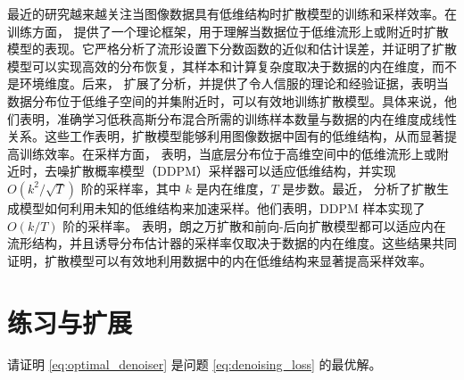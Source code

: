 \documentclass[../../book-main_zh.tex]{subfiles}
\begin{document}

 
最近的研究越来越关注当图像数据具有低维结构时扩散模型的训练和采样效率。在训练方面，\cite{chen2023score} 提供了一个理论框架，用于理解当数据位于低维流形上或附近时扩散模型的表现。它严格分析了流形设置下分数函数的近似和估计误差，并证明了扩散模型可以实现高效的分布恢复，其样本和计算复杂度取决于数据的内在维度，而不是环境维度。后来，\cite{wang2024diffusion} 扩展了分析，并提供了令人信服的理论和经验证据，表明当数据分布位于低维子空间的并集附近时，可以有效地训练扩散模型。具体来说，他们表明，准确学习低秩高斯分布混合所需的训练样本数量与数据的内在维度成线性关系。这些工作表明，扩散模型能够利用图像数据中固有的低维结构，从而显著提高训练效率。在采样方面，\cite{li2024adapting} 表明，当底层分布位于高维空间中的低维流形上或附近时，去噪扩散概率模型（DDPM）采样器可以适应低维结构，并实现 $O(k^2/\sqrt{T})$ 阶的采样率，其中 $k$ 是内在维度，$T$ 是步数。最近，\cite{liang2025low} 分析了扩散生成模型如何利用未知的低维结构来加速采样。他们表明，DDPM 样本实现了 $O(k/T)$ 阶的采样率。\cite{tang2024adaptivity} 表明，朗之万扩散和前向-后向扩散模型都可以适应内在流形结构，并且诱导分布估计器的采样率仅取决于数据的内在维度。这些结果共同证明，扩散模型可以有效地利用数据中的内在低维结构来显著提高采样效率。















\section{练习与扩展}

\begin{exercise}
    请证明 \eqref{eq:optimal_denoiser} 是问题 \eqref{eq:denoising_loss} 的最优解。
\end{exercise}
\end{document}
